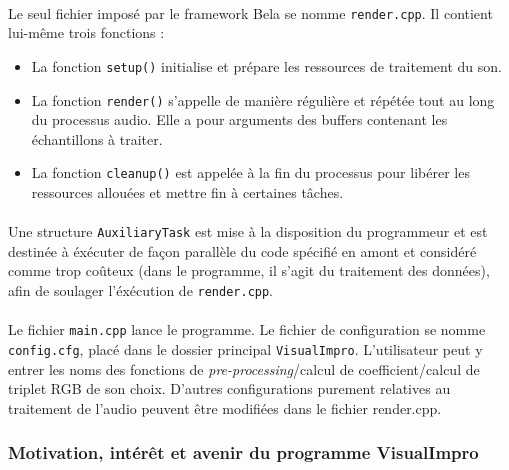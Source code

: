 \paragraph{}
Le seul fichier imposé par le framework Bela se nomme \verb!render.cpp!. Il
contient lui-même trois fonctions :
\begin{itemize}
 \item La fonction \verb!setup()! initialise et prépare les ressources de
       traitement du son.
 \item La fonction \verb!render()! s'appelle de manière régulière et répétée
       tout au long du processus audio. Elle a pour arguments des buffers
       contenant les échantillons à traiter.
 \item La fonction \verb!cleanup()! est appelée à la fin du processus pour
       libérer les ressources allouées et mettre fin à certaines tâches.
\end{itemize}

\paragraph{}
Une structure \verb!AuxiliaryTask! est mise à la disposition du
programmeur et est destinée à éxécuter de façon parallèle du code spécifié
en amont et considéré comme trop coûteux (dans le programme, il s'agit du
traitement des données), afin de soulager l'éxécution de \verb!render.cpp!.

\paragraph{}
Le fichier \verb!main.cpp! lance le programme. Le fichier de
configuration se nomme \verb!config.cfg!, placé dans le dossier
principal \verb!VisualImpro!.  L'utilisateur peut y entrer les noms
des fonctions de \textit{pre-processing}/calcul de coefficient/calcul
de triplet RGB de son choix. D'autres configurations purement
relatives au traitement de l'audio peuvent être modifiées dans le
fichier render.cpp.

\subsubsection{Motivation, intérêt et avenir du programme VisualImpro}
